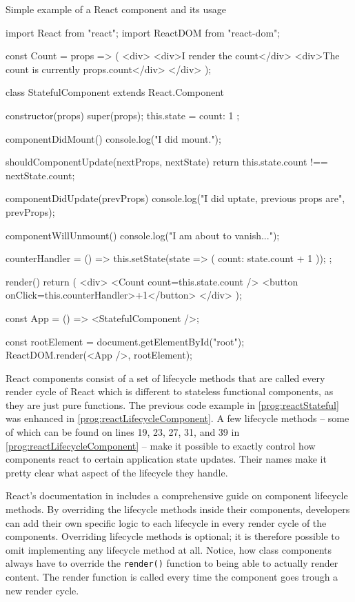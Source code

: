 \begin{program}
\caption{Simple example of a React component and its usage} 
\label{prog:reactLifecycleComponent}
\begin{JsCode}
import React from "react";
import ReactDOM from "react-dom";

const Count = props => (
  <div>
    <div>I render the count</div>
    <div>The count is currently {props.count}</div>
  </div>
);

class StatefulComponent extends React.Component {
  constructor(props) {
    super(props);
    this.state = {
      count: 1
    };
  }

  componentDidMount() {
    console.log("I did mount.");
  }

  shouldComponentUpdate(nextProps, nextState) {
    return this.state.count !== nextState.count;
  }

  componentDidUpdate(prevProps) {
    console.log("I did uptate, previous props are", prevProps);
  }

  componentWillUnmount() {
    console.log("I am about to vanish...");
  }

  counterHandler = () => {
    this.setState(state => ({ count: state.count + 1 }));
  };

  render() {
    return (
      <div>
        <Count count={this.state.count} />
        <button onClick={this.counterHandler}>+1</button>
      </div>
    );
  }
}
  
const App = () => <StatefulComponent />;

const rootElement = document.getElementById("root");
ReactDOM.render(<App />, rootElement);  
\end{JsCode}
\end{program}

React components consist of a set of lifecycle methods that are called every render cycle of React which is different to stateless functional components, as they are just pure functions. The previous code example in \ref{prog:reactStateful} was enhanced in \ref{prog:reactLifecycleComponent}. A few lifecycle methods -- some of which can be found on lines 19, 23, 27, 31, and 39 in \ref{prog:reactLifecycleComponent} -- make it possible to exactly control how components react to certain application state updates. Their names make it pretty clear what aspect of the lifecycle they handle.

React's documentation in \cite[/docs/react-component.html]{React} includes a comprehensive guide on component lifecycle methods. By overriding the lifecycle methods inside their components, developers can add their own specific logic to each lifecycle in every render cycle of the components. Overriding lifecycle methods is optional; it is therefore possible to omit implementing any lifecycle method at all. Notice, how class components always have to override the \texttt{render()} function to being able to actually render content. The render function is called every time the component goes trough a new render cycle.

